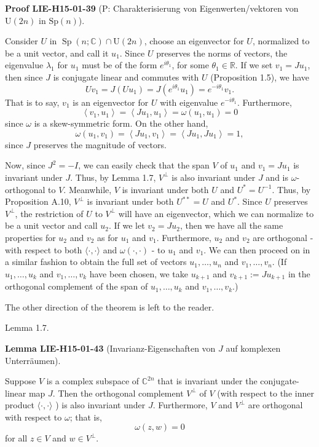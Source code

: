 \documentclass[10pt, letterpaper]{article}
\newcommand{\Sp}{\mathrm{Sp}}
\newcommand{\U}{\mathrm{U}}
\newcommand{\CustomHeading}[3]{%
  \par\medskip\noindent%
  \textbf{#1 #2} \textnormal{(#3)}.\enskip%
}
\newenvironment{LEM}[2]{\begin{unitbox}\CustomHeading{Lemma}{#1}{#2}}{\end{unitbox}}
\newenvironment{PROOF}[2]{\begin{unitbox}\CustomHeading{Proof}{#1}{#2}}{\end{unitbox}}
\begin{document}
\begin{PROOF}{LIE-H15-01-39}{P: Charakterisierung von Eigenwerten/vektoren von $\U(2n)$ in $\Sp(n)$}
Consider $U$ in $\operatorname{Sp}(n ; \mathbb{C}) \cap \mathrm{U}(2 n)$, choose an eigenvector for $U$, normalized to be a unit vector, and call it $u_{1}$. Since $U$ preserves the norms of vectors, the eigenvalue $\lambda_{1}$ for $u_{1}$ must be of the form $e^{i \theta_{1}}$, for some $\theta_{1} \in \mathbb{R}$. If we set $v_{1}=J u_{1}$, then since $J$ is conjugate linear and commutes with $U$ (Proposition 1.5), we have
$$
U v_{1}=J\left(U u_{1}\right)=J\left(e^{i \theta_{1}} u_{1}\right)=e^{-i \theta_{1}} v_{1} .
$$
That is to say, $v_{1}$ is an eigenvector for $U$ with eigenvalue $e^{-i \theta_{1}}$. Furthermore,
$$
\left\langle v_{1}, u_{1}\right\rangle=\left\langle J u_{1}, u_{1}\right\rangle=\omega\left(u_{1}, u_{1}\right)=0
$$
since $\omega$ is a skew-symmetric form. On the other hand,
$$
\omega\left(u_{1}, v_{1}\right)=\left\langle J u_{1}, v_{1}\right\rangle=\left\langle J u_{1}, J u_{1}\right\rangle=1,
$$
since $J$ preserves the magnitude of vectors.

Now, since $J^{2}=-I$, we can easily check that the span $V$ of $u_{1}$ and $v_{1}=J u_{1}$ is invariant under $J$. Thus, by Lemma 1.7, $V^{\perp}$ is also invariant under $J$ and is $\omega$-orthogonal to $V$. Meanwhile, $V$ is invariant under both $U$ and $U^{*}=U^{-1}$. Thus, by Proposition A.10, $V^{\perp}$ is invariant under both $U^{* *}=U$ and $U^{*}$. Since $U$ preserves $V^{\perp}$, the restriction of $U$ to $V^{\perp}$ will have an eigenvector, which we can normalize to be a unit vector and call $u_{2}$. If we let $v_{2}=J u_{2}$, then we have all the same properties for $u_{2}$ and $v_{2}$ as for $u_{1}$ and $v_{1}$. Furthermore, $u_{2}$ and $v_{2}$ are orthogonal - with respect to both $\langle\cdot, \cdot\rangle$ and $\omega(\cdot, \cdot)$ - to $u_{1}$ and $v_{1}$. We can then proceed on in a similar fashion to obtain the full set of vectors $u_{1}, \ldots, u_{n}$ and $v_{1}, \ldots, v_{n}$. (If $u_{1}, \ldots, u_{k}$ and $v_{1}, \ldots, v_{k}$ have been chosen, we take $u_{k+1}$ and $v_{k+1}:=J u_{k+1}$ in the orthogonal complement of the span of $u_{1}, \ldots, u_{k}$ and $v_{1}, \ldots, v_{k}$.)

The other direction of the theorem is left to the reader.
\end{PROOF}


Lemma 1.7. 


\begin{LEM}{LIE-H15-01-43}{Invarianz-Eigenschaften von $J$ auf komplexen Unterräumen}
Suppose $V$ is a complex subspace of $\mathbb{C}^{2 n}$ that is invariant under the conjugate-linear map $J$. Then the orthogonal complement $V^{\perp}$ of $V$ (with respect to the inner product $\langle\cdot, \cdot\rangle$ ) is also invariant under $J$. Furthermore, $V$ and $V^{\perp}$ are orthogonal with respect to $\omega$; that is,
$$
\omega(z, w)=0
$$
for all $z \in V$ and $w \in V^{\perp}$.
\end{LEM}
\end{document}
